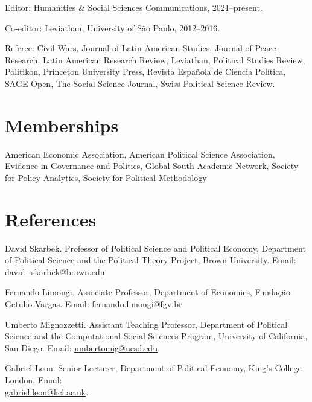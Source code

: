 \documentclass[a4paper]{article}
\renewenvironment{itemize}{
	\begin{list}{}{
			\setlength{\leftmargin}{1.5em}
		}
		}{
	\end{list}
}
\begin{document}
\begin{itemize}
\item Editor: Humanities \& Social Sciences Communications, 2021--present.
\item Co-editor: Leviathan, University of São Paulo, 2012--2016.
\item Referee: Civil Wars, Journal of Latin American Studies, Journal of Peace Research, Latin American Research Review, Leviathan, Political Studies Review, Politikon, Princeton University Press, Revista Española de Ciencia Política, SAGE Open, The Social Science Journal, Swiss Political Science Review.
\end{itemize}

\section*{Memberships}

\begin{itemize}
\item American Economic Association, American Political Science Association, Evidence in Governance and Politics, Global South Academic Network, Society for Policy Analytics, Society for Political Methodology
\end{itemize}

\section*{References}

\begin{itemize}

\item David Skarbek. Professor of Political Science and Political Economy, Department of Political Science and the Political Theory Project, Brown University. Email: \href{mailto:davidskarbek@gmail.com}{david\_skarbek@brown.edu}.
\item Fernando Limongi. Associate Professor, Department of Economics, Fundação Getulio Vargas. Email: \href{mailto:fernando.limongi@fgv.br}{fernando.limongi@fgv.br}.
\item Umberto Mignozzetti. Assistant Teaching Professor, Department of Political Science and the Computational Social Sciences Program, University of California, San Diego. Email: \href{mailto:umbertomig@ucsd.edu}{umbertomig@ucsd.edu}.
\item Gabriel Leon. Senior Lecturer, Department of Political Economy, King's College London. Email: \\ \href{mailto:gabriel.leon@kcl.ac.uk}{gabriel.leon@kcl.ac.uk}.
\end{itemize}

	\bigskip
\end{document}
